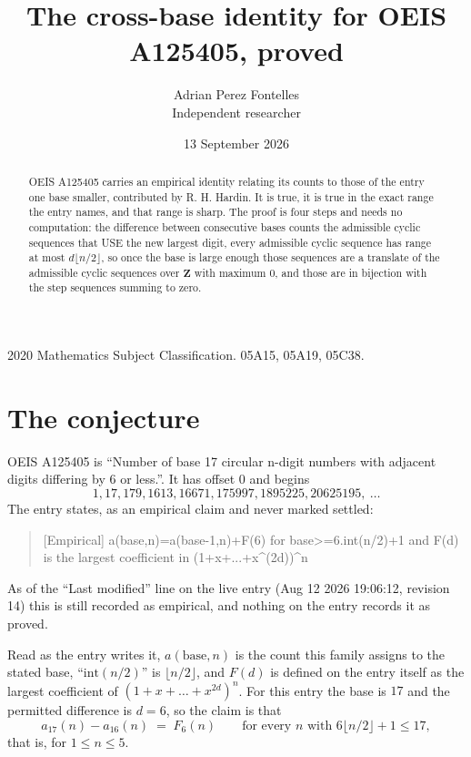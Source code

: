 \documentclass[11pt,a4paper]{article}
\title{The cross-base identity for OEIS A125405, proved}
\author{Adrian Perez Fontelles\\ \small Independent researcher}
\date{13 September 2026}
\theoremstyle{plain}
\theoremstyle{definition}
\begin{document}
\maketitle

\begin{abstract}
OEIS A125405 carries an empirical identity relating its counts to those of the entry one base
smaller, contributed by R. H. Hardin. It is true, it is true in the exact range the entry
names, and that range is sharp. The proof is four steps and needs no computation: the
difference between consecutive bases counts the admissible cyclic sequences that USE the new
largest digit, every admissible cyclic sequence has range at most $d\lfloor n/2\rfloor$, so
once the base is large enough those sequences are a translate of the admissible cyclic
sequences over $\mathbf{Z}$ with maximum $0$, and those are in bijection with the step
sequences summing to zero.
\end{abstract}

\noindent\small 2020 Mathematics Subject Classification. 05A15, 05A19, 05C38.\normalsize

\section{The conjecture}

OEIS A125405 is ``Number of base 17 circular n-digit numbers with adjacent digits differing by 6 or less.''. It has offset $0$ and begins
\[
1, 17, 179, 1613, 16671, 175997, 1895225, 20625195,\ \dots
\]
The entry states, as an empirical claim and never marked settled:
\begin{quote}
[Empirical] a(base,n)=a(base-1,n)+F(6) for base>=6.int(n/2)+1 and F(d) is the largest coefficient in (1+x+...+x\textasciicircum{}(2d))\textasciicircum{}n
\end{quote}
As of the ``Last modified'' line on the live entry (Aug 12 2026 19:06:12, revision 14)
this is still recorded as empirical, and nothing on the entry records it as proved.

Read as the entry writes it, $a(\mathrm{base},n)$ is the count this family assigns to the
stated base, ``$\mathrm{int}(n/2)$'' is $\lfloor n/2\rfloor$, and $F(d)$ is defined on the
entry itself as the largest coefficient of $(1+x+\dots+x^{2d})^{n}$. For this entry
the base is $17$ and the permitted difference is $d=6$, so the claim is that
\[
a_{17}(n)-a_{16}(n)\;=\;F_{6}(n)
\qquad\text{for every } n \text{ with } 6\lfloor n/2\rfloor+1\le17,
\]
that is, for $1\le n\le5$.
\end{document}
